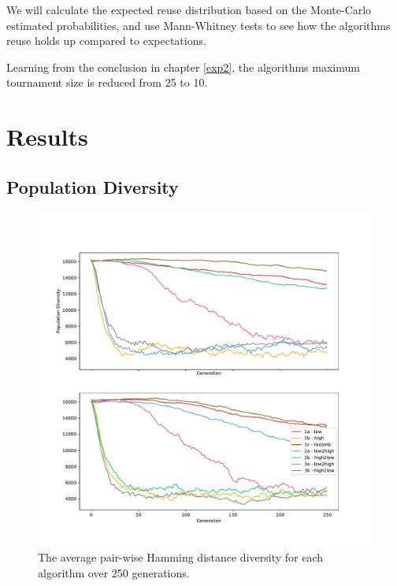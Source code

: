 We will calculate the expected reuse distribution based on the Monte-Carlo estimated probabilities, and use Mann-Whitney tests to see how the algorithms reuse holds up compared to expectations. 

Learning from the conclusion in chapter \ref{exp2}, the algorithms maximum tournament size is reduced from 25 to 10.

\section{Results}
\subsection{Population Diversity}
\begin{figure}[h!]
    \includegraphics[width=\textwidth, center]{Chapters/4.Experiments/exp3/figures/diversity_hamming.pdf}
    \caption[Hamming diversity plot]{The average pair-wise Hamming distance diversity for each algorithm over 250 generations.}
    \label{fig:exp3.hamming}
\end{figure}

